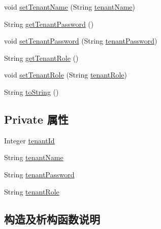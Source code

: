 \begin{DoxyCompactItemize}
\item 
void \mbox{\hyperlink{classcom_1_1example_1_1demo_1_1modular_1_1_vtenant_ab6161d0fc173611822e1c0147c9c140f}{set\+Tenant\+Name}} (String \mbox{\hyperlink{classcom_1_1example_1_1demo_1_1modular_1_1_vtenant_ae098be6ec95e07dfef7ca5dde2f2b6de}{tenant\+Name}})
\item 
String \mbox{\hyperlink{classcom_1_1example_1_1demo_1_1modular_1_1_vtenant_aa30b58e81ae50582887fe923da24e7f5}{get\+Tenant\+Password}} ()
\item 
void \mbox{\hyperlink{classcom_1_1example_1_1demo_1_1modular_1_1_vtenant_a76f2678c222c963cb9cb13953c041323}{set\+Tenant\+Password}} (String \mbox{\hyperlink{classcom_1_1example_1_1demo_1_1modular_1_1_vtenant_afdfb384c6cf40c07fa2a55b2c99129d1}{tenant\+Password}})
\item 
String \mbox{\hyperlink{classcom_1_1example_1_1demo_1_1modular_1_1_vtenant_abc848063e7f02a0b626f61004b2dd8c4}{get\+Tenant\+Role}} ()
\item 
void \mbox{\hyperlink{classcom_1_1example_1_1demo_1_1modular_1_1_vtenant_aae7aca48c8730baec19fabb7838b52a1}{set\+Tenant\+Role}} (String \mbox{\hyperlink{classcom_1_1example_1_1demo_1_1modular_1_1_vtenant_ab11fe2c741cf1c5e88370cd851445ee3}{tenant\+Role}})
\item 
String \mbox{\hyperlink{classcom_1_1example_1_1demo_1_1modular_1_1_vtenant_aafb688663b05c28d833180cd780951d0}{to\+String}} ()
\end{DoxyCompactItemize}
\subsection*{Private 属性}
\begin{DoxyCompactItemize}
\item 
Integer \mbox{\hyperlink{classcom_1_1example_1_1demo_1_1modular_1_1_vtenant_a63d3b1766ff9475911742f1c837ff8ee}{tenant\+Id}}
\item 
String \mbox{\hyperlink{classcom_1_1example_1_1demo_1_1modular_1_1_vtenant_ae098be6ec95e07dfef7ca5dde2f2b6de}{tenant\+Name}}
\item 
String \mbox{\hyperlink{classcom_1_1example_1_1demo_1_1modular_1_1_vtenant_afdfb384c6cf40c07fa2a55b2c99129d1}{tenant\+Password}}
\item 
String \mbox{\hyperlink{classcom_1_1example_1_1demo_1_1modular_1_1_vtenant_ab11fe2c741cf1c5e88370cd851445ee3}{tenant\+Role}}
\end{DoxyCompactItemize}


\subsection{构造及析构函数说明}
\mbox{\label{classcom_1_1example_1_1demo_1_1modular_1_1_vtenant_aa6f3ffb3f3f6cf048af259117bb0fe8b}} 
